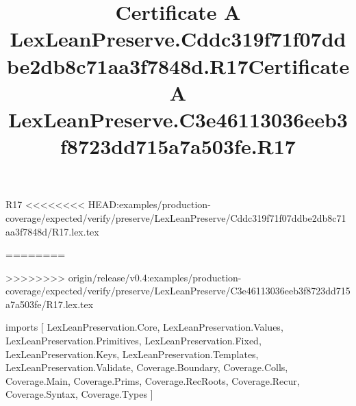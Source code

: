\begin{lexlean}{R17}
<<<<<<<< HEAD:examples/production-coverage/expected/verify/preserve/LexLeanPreserve/Cddc319f71f07ddbe2db8c71aa3f7848d/R17.lex.tex
\title{Certificate A LexLeanPreserve.Cddc319f71f07ddbe2db8c71aa3f7848d.R17}
========
\title{Certificate A LexLeanPreserve.C3e46113036eeb3f8723dd715a7a503fe.R17}
>>>>>>>> origin/release/v0.4:examples/production-coverage/expected/verify/preserve/LexLeanPreserve/C3e46113036eeb3f8723dd715a7a503fe/R17.lex.tex
\begin{coremodule}
imports [
  LexLeanPreservation.Core,
  LexLeanPreservation.Values,
  LexLeanPreservation.Primitives,
  LexLeanPreservation.Fixed,
  LexLeanPreservation.Keys,
  LexLeanPreservation.Templates,
  LexLeanPreservation.Validate,
  Coverage.Boundary,
  Coverage.Colls,
  Coverage.Main,
  Coverage.Prims,
  Coverage.RecRoots,
  Coverage.Recur,
  Coverage.Syntax,
  Coverage.Types
]


\end{coremodule}
\end{lexlean}
